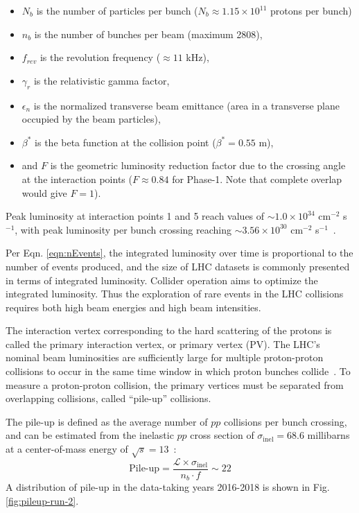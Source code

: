 \begin{itemize}
    \item $N_b$ is the number of particles per bunch ($N_b \approx 1.15 \times 10^{11}$ protons per bunch)
    \item $n_b$ is the number of bunches per beam (maximum 2808),
    \item $f_{rev}$ is the revolution frequency ($\approx 11$ kHz),
    \item $\gamma_r$ is the relativistic gamma factor,
    \item $\epsilon_n$ is the normalized transverse beam emittance (area in a transverse plane occupied by the beam particles),
    \item $\beta^*$ is the beta function at the collision point ($\beta^* = 0.55$ m),
    \item and $F$ is the geometric luminosity reduction factor due to the crossing angle at the interaction points ($F \approx 0.84$ for Phase-1. Note that complete overlap would give $F = 1$).
\end{itemize}
Peak luminosity at interaction points 1 and 5 reach values of $\sim 1.0 \times 10^{34}$ cm$^{-2}$ s$^{-1}$, with peak luminosity per bunch crossing reaching $\sim 3.56 \times 10^{30}$ cm$^{-2}$ s$^{-1}$~\cite{LHC-phase-1-design-report}.

Per Eqn. \ref{eqn:nEvents}, the integrated luminosity over time is proportional to the number of events produced, and the size of LHC datasets is commonly presented in terms of integrated luminosity. Collider operation aims to optimize the integrated luminosity. Thus the exploration of rare events in the LHC collisions requires both high beam energies and high beam intensities.

The interaction vertex corresponding to the hard scattering of the protons is called the primary interaction vertex, or primary vertex (PV). The LHC's nominal beam luminosities are sufficiently large for multiple proton-proton collisions to occur in the same time window in which proton bunches collide~\cite{CMS-JME-18-001}. To measure a proton-proton collision, the primary vertices must be separated from overlapping collisions, called ``pile-up'' collisions.

The pile-up is defined as the average number of $pp$ collisions per bunch crossing, and can be estimated from the inelastic $pp$ cross section of $\sigma_{\text{inel}} = 68.6$ millibarns at a center-of-mass energy of $\sqrt{s} = 13$\TeV~\cite{CERN-EP-2018-004-pileup}:
\begin{equation}
    \text{Pile-up} = \frac{\mathcal{L} \times \sigma_{\text{inel}}}{ n_b \cdot f} \sim 22
\end{equation}
A distribution of pile-up in the data-taking years 2016-2018 is shown in Fig. \ref{fig:pileup-run-2}.


